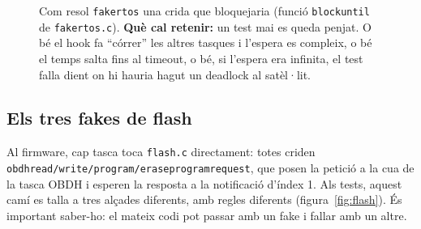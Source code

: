 \documentclass[11pt,a4paper]{article}
\DeclareRobustCommand{\_}{\textunderscore\allowbreak}
\newcommand{\cd}[1]{\texttt{#1}}
\begin{document}
\begin{figure}[p]
\caption{Com resol \cd{fake\_rtos} una crida que bloquejaria (funció \cd{block\_until} de
\cd{fake\_rtos.c}). \textbf{Què cal retenir:} un test mai es queda penjat. O bé el hook fa
``córrer'' les altres tasques i l'espera es compleix, o bé el temps salta fins al timeout, o bé, si
l'espera era infinita, el test falla dient on hi hauria hagut un deadlock al satèl·lit.}
\label{fig:rtos}
\end{figure}

\subsection{Els tres fakes de flash}

Al firmware, cap tasca toca \cd{flash.c} directament: totes criden
\cd{obdh\_read/write/program/erase\_program\_request}, que posen la petició a la cua de
la tasca OBDH i esperen la resposta a la notificació d'índex 1. Als tests, aquest camí
es talla a tres alçades diferents, amb regles diferents (figura~\ref{fig:flash}). És
important saber-ho: el mateix codi pot passar amb un fake i fallar amb un altre.
\end{document}
